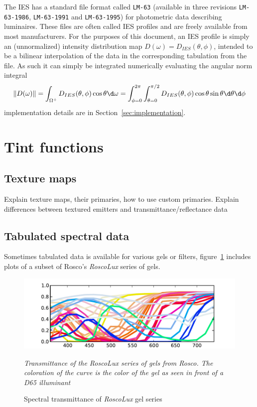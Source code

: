 The \gls{IES} has a standard file format called \texttt{LM-63} (available in
three revisions \texttt{LM-63-1986}, \texttt{LM-63-1991} and
\texttt{LM-63-1995}) for photometric data describing luminaires. These files
are often called \gls{IES} profiles and are freely available from most
manufacturers. For the purposes of this document, an \gls{IES} profile
is simply an (unnormalized) intensity distribution map $D(\omega) =
D_{IES}(\theta,\phi)$, intended to be a bilinear interpolation of the data in
the corresponding tabulation from the file. As such it can simply be integrated
numerically evaluating the angular norm integral
\begin{equation}
\|D(\omega)\|
   = \int_{\Omega^+}  D_{IES}(\theta,\phi) \cos\theta \d\omega
   = \int_{\phi = 0}^{2\pi} \int_{\theta = 0}^{\pi/2}
        D_{IES}(\theta,\phi) \cos\theta \sin\theta \d\theta \d\phi
\end{equation}
implementation details are in Section~\ref{sec:implementation}.

\section{Tint functions}

\subsection{Texture maps}
Explain texture maps, their primaries, how to use custom primaries.
Explain differences between textured emitters and transmittance/reflectance data


\subsection{Tabulated spectral data}
Sometimes tabulated data is available for various gels or filters, figure~\ref{fig:roscolux}
includes plots of a subset of Rosco's \emph{RoscoLux} series of gels.

\begin{figure}
{
\centering
\includegraphics{figures/roscolux.pdf}
\caption{Spectral transmittance of \emph{RoscoLux} gel series}
\label{fig:roscolux}
}
\vskip 1mm
{\footnotesize\it Transmittance of the \emph{RoscoLux} series of gels from
Rosco. The coloration of the curve is the color of the gel as seen in front
of a D65 illuminant}
\end{figure}


